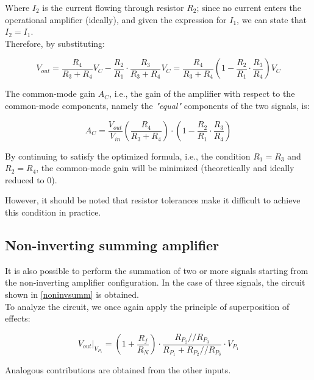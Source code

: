 \documentclass[../main.tex]{subfiles}
\begin{document}
Where $I_2$ is the current flowing through resistor $R_2$; since no current enters the operational amplifier (ideally), and given the expression for $I_1$, we can state that $I_2 = I_1$. \\

Therefore, by substituting:

\begin{equation}
	V_{out} = \frac{R_4}{R_3 + R_4} V_C - \frac{R_2}{R_1} \cdot \frac{R_3}{R_3 + R_4} V_C = \frac{R_4}{R_3 + R_4} \left( 1 - \frac{R_2}{R_1} \cdot \frac{R_3}{R_4} \right) V_C
\end{equation}


The common-mode gain $A_C$, i.e., the gain of the amplifier with respect to the common-mode components, namely the \textit{"equal"} components of the two signals, is:

\begin{equation}
	A_C = \frac{V_{out}}{V_{in}} \left( \frac{R_4}{R_3 + R_4} \right) \cdot \left( 1 - \frac{R_2}{R_1}  \cdot  \frac{R_3}{R_4} \right)
\end{equation}



By continuing to satisfy the optimized formula, i.e., the condition $R_1 = R_3$ and $R_2 = R_4$, the common-mode gain will be minimized (theoretically and ideally reduced to 0). 

However, it should be noted that resistor tolerances make it difficult to achieve this condition in practice.


\subsection{Non-inverting summing amplifier}
\label{nonincsummamp}

It is also possible to perform the summation of two or more signals starting from the non-inverting amplifier configuration. In the case of three signals, the circuit shown in \autoref{noninvsumm} is obtained.\\

To analyze the circuit, we once again apply the principle of superposition of effects:

\begin{equation}
	V_{out} \big|_{V_{P_1}} = \left( 1 + \frac{R_f}{R_N} \right) \cdot \frac{R_{P_2} // R_{P_3}}{R_{P_1} + R_{P_2} // R_{P_3}} \cdot V_{P_1}
\end{equation}


Analogous contributions are obtained from the other inputs.\\
\end{document}

